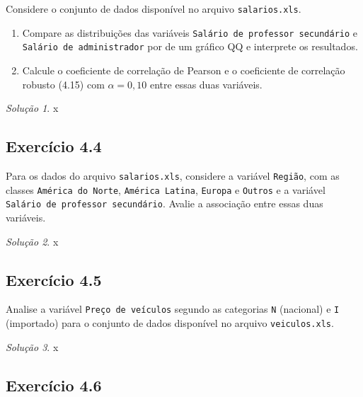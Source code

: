 \documentclass[
]{latex/krantz}
\providecommand{\tightlist}{%
  \setlength{\itemsep}{0pt}\setlength{\parskip}{0pt}}
\theoremstyle{definition}
\theoremstyle{definition}
\theoremstyle{definition}
\theoremstyle{definition}
\theoremstyle{remark}
\newtheorem*{solution}{Solução}
\begin{document}
Considere o conjunto de dados disponível no arquivo \texttt{salarios.xls}.

\begin{enumerate}
\def\labelenumi{\alph{enumi}.}
\tightlist
\item
  Compare as distribuições das variáveis \texttt{Salário\ de\ professor\ secundário} e \texttt{Salário\ de\ administrador} por de um gráfico QQ e interprete os resultados.
\item
  Calcule o coeficiente de correlação de Pearson e o coeficiente de correlação robusto (4.15) com \(\alpha = 0,10\) entre essas duas variáveis.
\end{enumerate}

\begin{solution}
x
\end{solution}

\hypertarget{exr4-4}{%
\subsection*{Exercício 4.4}\label{exr4-4}}

Para os dados do arquivo \texttt{salarios.xls}, considere a variável \texttt{Região}, com as classes \texttt{América\ do\ Norte}, \texttt{América\ Latina}, \texttt{Europa} e \texttt{Outros} e a variável \texttt{Salário\ de\ professor\ secundário}. Avalie a associação entre essas duas variáveis.

\begin{solution}
x
\end{solution}

\hypertarget{exr4-5}{%
\subsection*{Exercício 4.5}\label{exr4-5}}

Analise a variável \texttt{Preço\ de\ veículos} segundo as categorias \texttt{N} (nacional) e \texttt{I} (importado) para o conjunto de dados disponível no arquivo \texttt{veiculos.xls}.

\begin{solution}
x
\end{solution}

\hypertarget{exr4-6}{%
\subsection*{Exercício 4.6}\label{exr4-6}}
\end{document}
